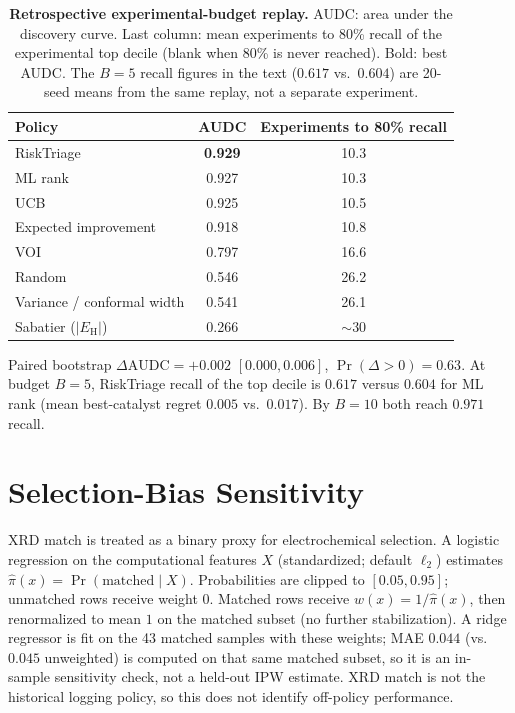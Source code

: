 \documentclass{article}
\begin{document}
\begin{table}[h]
\centering
\caption{\textbf{Retrospective experimental-budget replay.}
AUDC: area under the discovery curve.
Last column: mean experiments to 80\% recall of the experimental top decile (blank when 80\% is never reached).
Bold: best AUDC. The $B=5$ recall figures in the text ($0.617$ vs.\ $0.604$) are 20-seed means from the same replay, not a separate experiment.}
\label{tab:app_discovery}
\small
\begin{tabular}{lcc}
\toprule
Policy & AUDC & Experiments to 80\% recall\\
\midrule
RiskTriage & \textbf{0.929} & 10.3\\
ML rank & 0.927 & 10.3\\
UCB & 0.925 & 10.5\\
Expected improvement & 0.918 & 10.8\\
VOI & 0.797 & 16.6\\
Random & 0.546 & 26.2\\
Variance / conformal width & 0.541 & 26.1\\
Sabatier ($|E_{\mathrm{H}}|$) & 0.266 & ${\sim}30$\\
\bottomrule
\end{tabular}
\end{table}

Paired bootstrap $\Delta\mathrm{AUDC}=+0.002$ $[0.000,0.006]$, $\Pr(\Delta>0)=0.63$.
At budget $B=5$, RiskTriage recall of the top decile is $0.617$ versus $0.604$ for ML rank (mean best-catalyst regret $0.005$ vs.\ $0.017$).
By $B=10$ both reach $0.971$ recall.

\section{Selection-Bias Sensitivity}
\label{app:ipw}

XRD match is treated as a binary proxy for electrochemical selection.
A logistic regression on the computational features $X$ (standardized; default $\ell_2$) estimates $\hat\pi(x)=\Pr(\mathrm{matched}\mid X)$.
Probabilities are clipped to $[0.05,0.95]$; unmatched rows receive weight $0$.
Matched rows receive $w(x)=1/\hat\pi(x)$, then renormalized to mean $1$ on the matched subset (no further stabilization).
A ridge regressor is fit on the 43 matched samples with these weights; MAE $0.044$ (vs.\ $0.045$ unweighted) is computed on that same matched subset, so it is an in-sample sensitivity check, not a held-out IPW estimate.
XRD match is not the historical logging policy, so this does not identify off-policy performance.
\end{document}
